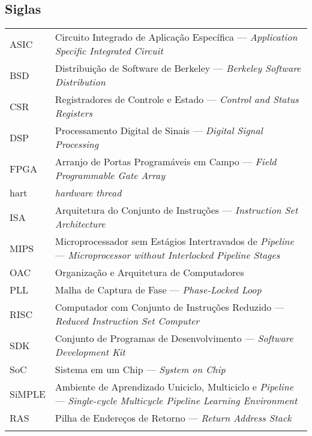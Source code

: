 


\subsection*{Siglas}

\begin{tabular}{p{}p{}}
    {ASIC} & {Circuito Integrado de Aplicação Específica --- \textit{Application Specific Integrated Circuit}}\tabularnewline{}
    {BSD} & {Distribuição de Software de Berkeley --- \textit{Berkeley Software Distribution}}\tabularnewline{}
    {CSR} & {Registradores de Controle e Estado --- \textit{Control and Status Registers}} \tabularnewline{}
    {DSP} & {Processamento Digital de Sinais --- \textit{Digital Signal Processing}} \tabularnewline{}
    {FPGA} & {Arranjo de Portas Programáveis em Campo --- \textit{Field Programmable Gate Array}} \tabularnewline{}
    {hart} & {\textit{hardware thread}} \tabularnewline{}
    {ISA} & {Arquitetura do Conjunto de Instruções --- \textit{Instruction Set Architecture}} \tabularnewline{}
    {MIPS} & {Microprocessador sem Estágios Intertravados de \textit{Pipeline} --- \textit{Microprocessor without Interlocked Pipeline Stages}} \tabularnewline{}
    {OAC} & {Organização e Arquitetura de Computadores} \tabularnewline{}
    {PLL} & {Malha de Captura de Fase --- \textit{Phase-Locked Loop}} \tabularnewline{}
    {RISC} & {Computador com Conjunto de Instruções Reduzido --- \textit{Reduced Instruction Set Computer}} \tabularnewline{}
    {SDK} & {Conjunto de Programas de Desenvolvimento --- \textit{Software Development Kit}} \tabularnewline{}
    {SoC} & {Sistema em um Chip --- \textit{System on Chip}} \tabularnewline{}
    {SiMPLE} & {Ambiente de Aprendizado Uniciclo, Multiciclo e \textit{Pipeline} --- \textit{Single-cycle Multicycle Pipeline Learning Environment}} \tabularnewline{}
    {RAS} & {Pilha de Endereços de Retorno --- \textit{Return Address Stack}} \tabularnewline{}
\end{tabular}
